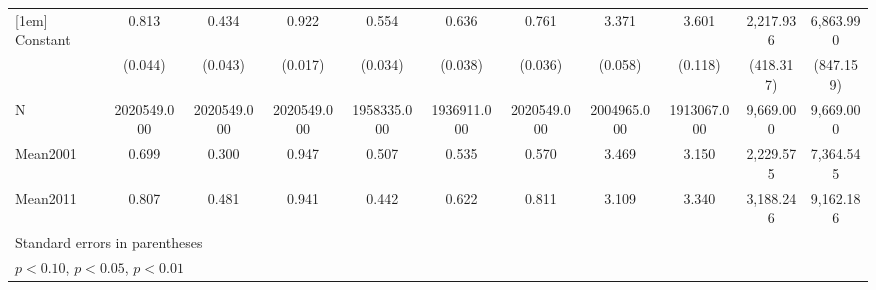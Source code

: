 {\begin{tabular}{l*{10}{c}}
[1em]
Constant        &    0.813\sym{***}&    0.434\sym{***}&    0.922\sym{***}&    0.554\sym{***}&    0.636\sym{***}&    0.761\sym{***}&    3.371\sym{***}&    3.601\sym{***}&2,217.936\sym{***}&6,863.990\sym{***}\\
                &  (0.044)         &  (0.043)         &  (0.017)         &  (0.034)         &  (0.038)         &  (0.036)         &  (0.058)         &  (0.118)         &(418.317)         &(847.159)         \\
\hline
N               &2020549.000         &2020549.000         &2020549.000         &1958335.000         &1936911.000         &2020549.000         &2004965.000         &1913067.000         &9,669.000         &9,669.000         \\
Mean2001        &    0.699         &    0.300         &    0.947         &    0.507         &    0.535         &    0.570         &    3.469         &    3.150         &2,229.575         &7,364.545         \\
Mean2011        &    0.807         &    0.481         &    0.941         &    0.442         &    0.622         &    0.811         &    3.109         &    3.340         &3,188.246         &9,162.186         \\
\hline\hline
\multicolumn{11}{l}{\footnotesize Standard errors in parentheses}\\
\multicolumn{11}{l}{\footnotesize \sym{*} \(p<0.10\), \sym{**} \(p<0.05\), \sym{***} \(p<0.01\)}\\
\end{tabular}
}

